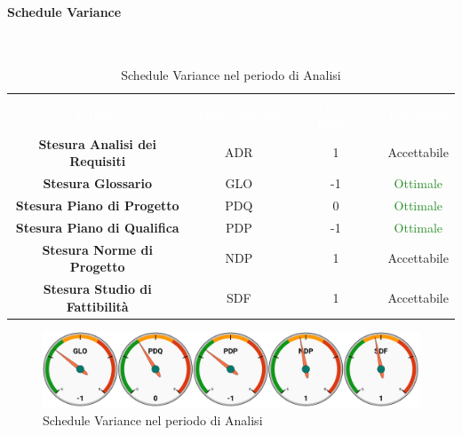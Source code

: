 \paragraph{Schedule Variance}\mbox{}\\[0,3cm]
\begin{table}[H]
    \centering
    \begin{tabular}{cccc}
        \rowcolor{greySWEight}
        \textcolor{white}{\textbf{Attività}} & 
        \textcolor{white}{\textbf{Abbreviazione}} &
        \textcolor{white}{\textbf{Valore Indice}}&
        \textcolor{white}{\textbf{Riscontro}}\\
		\textbf{Stesura Analisi dei Requisiti} & ADR & 1 & \textcolor{YellowOrange}{Accettabile}\\
		\textbf{Stesura Glossario} & GLO & -1 & \textcolor{ForestGreen}{Ottimale} \\
		\textbf{Stesura Piano di Progetto} & PDQ & 0 & \textcolor{ForestGreen}{Ottimale} \\
		\textbf{Stesura Piano di Qualifica} & PDP & -1 & \textcolor{ForestGreen}{Ottimale} \\
		\textbf{Stesura Norme di Progetto} & NDP & 1 & \textcolor{YellowOrange}{Accettabile} \\
		\textbf{Stesura Studio di Fattibilità} & SDF & 1 & \textcolor{YellowOrange}{Accettabile} \\

    \end{tabular}
    \caption{Schedule Variance nel periodo di Analisi}
\end{table}
\begin{figure}[H]
    \centering
	\includegraphics[width=1\linewidth]{sez/App_Esito/graph/AN_SV.pdf}
	\caption{Schedule Variance nel periodo di Analisi}
\end{figure}

